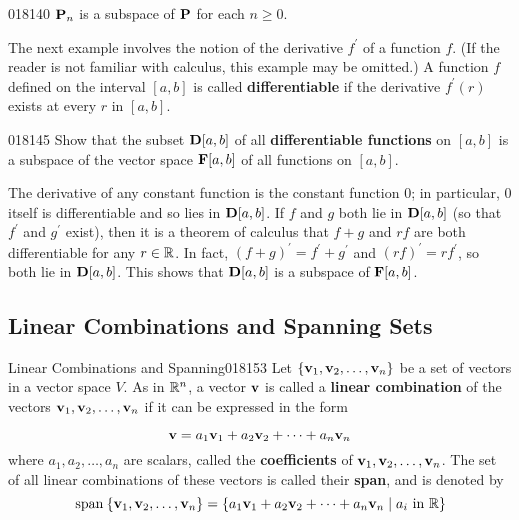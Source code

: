 \begin{example}{}{018140}
$\textbf{P}_{n}$ is a subspace of $\textbf{P}$ for each $n \geq 0$.
\end{example}

The next example involves the notion of the derivative $f^\prime$ of a function $f$. (If the reader is not familiar with calculus, this example may be omitted.) A function $f$ defined on the interval $[a, b]$ is called \textbf{differentiable} if the derivative $f^\prime(r)$ exists at every $r$ in $[a, b]$.

\begin{example}{}{018145}
Show that the subset $\textbf{D}[a, b]$ of all \textbf{differentiable functions} on $[a, b]$ is a subspace of the vector space $\textbf{F}[a, b]$ of all functions on $[a, b]$.

\begin{solution}
The derivative of any constant function is the constant function $0$; in particular, $0$ itself is differentiable and so lies in $\textbf{D}[a, b]$. If $f$ and $g$ both lie in $\textbf{D}[a, b]$ (so that $f^\prime$ and $g^\prime$ exist), then it is a theorem of calculus that $f + g$ and $rf$ are both differentiable for any $r \in \mathbb{R}$. In fact, $(f + g)^\prime = f^\prime + g^\prime$ and $(rf)^\prime = rf^\prime$, so both lie in $\textbf{D}[a, b]$. This shows that $\textbf{D}[a, b]$ is a subspace of $\textbf{F}[a, b]$.
\end{solution}
\end{example}

\subsection*{Linear Combinations and Spanning Sets}
\begin{definition}{Linear Combinations and Spanning}{018153}
Let $\{\textbf{v}_{1}, \textbf{v}_{2}, \dots, \textbf{v}_{n}\}$ be a set of vectors in a vector space $V$. As in $\mathbb{R}^n$, a vector $\textbf{v}$ is called a \textbf{linear  combination} of the vectors $\textbf{v}_{1}, \textbf{v}_{2}, \dots, \textbf{v}_{n}$  if it can be expressed in the form

\begin{equation*}
\textbf{v} = a_1\textbf{v}_1 + a_2\textbf{v}_2 + \dots + a_n\textbf{v}_n
\end{equation*}
where $a_{1}, a_{2}, \dots, a_{n}$ are scalars, called the \textbf{coefficients} of $\textbf{v}_{1}, \textbf{v}_{2}, \dots, \textbf{v}_{n}$. The set of all linear combinations of these vectors is called their \textbf{span}, and is denoted by
\begin{equation*}
\thinspace\operatorname{span\medspace}\{\textbf{v}_1, \textbf{v}_2, \dots, \textbf{v}_n\} = \{ a_1\textbf{v}_1 + a_2\textbf{v}_2 + \dots + a_n\textbf{v}_n \mid a_i \mbox{ in } \mathbb{R} \}
\end{equation*}
\end{definition}

